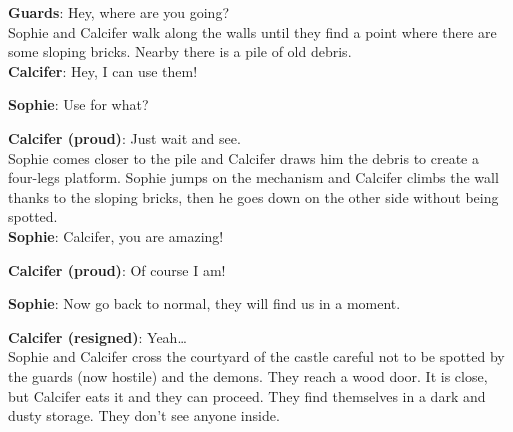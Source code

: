 \textbf{Guards}: Hey, where are you going?\\


\noindent Sophie and Calcifer walk along the walls until they find a point where there are some sloping bricks.
Nearby there is a pile of old debris.\\

\textbf{Calcifer}: Hey, I can use them!

\textbf{Sophie}: Use for what?

\textbf{Calcifer (proud)}: Just wait and see.\\

\noindent Sophie comes closer to the pile and Calcifer draws him the debris to create a four-legs platform.
Sophie jumps on the mechanism and Calcifer climbs the wall thanks to the sloping bricks, then he goes down on the other side without being spotted.\\

\textbf{Sophie}: Calcifer, you are amazing!

\textbf{Calcifer (proud)}: Of course I am!

\textbf{Sophie}: Now go back to normal, they will find us in a moment.

\textbf{Calcifer (resigned)}: Yeah…\\

\noindent Sophie and Calcifer cross the courtyard of the castle careful not to be spotted by the guards (now hostile) and the demons.
They reach a wood door. It is close, but Calcifer eats it and they can proceed. They find themselves in a dark and dusty storage. They don’t see anyone inside.\\

